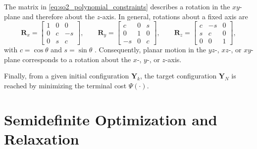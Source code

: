 The matrix in \eqref{eq:so2_polynomial_constraints} describes a rotation in the \(xy\)-plane and therefore about the \(z\)-axis. In general, rotations about a fixed axis are
\begin{equation}
\bm{R}_x=
\begin{bmatrix}
1&0&0\\
0&c&-s\\
0&s&c
\end{bmatrix},
\qquad
\bm{R}_y=
\begin{bmatrix}
c&0&s\\
0&1&0\\
-s&0&c
\end{bmatrix},
\qquad
\bm{R}_z=
\begin{bmatrix}
c&-s&0\\
s&c&0\\
0&0&1
\end{bmatrix},
\label{eq:axis_rotations}
\end{equation}
with \(c=\cos\theta\) and \(s=\sin\theta\) \cite{Sangli2025}.
Consequently, planar motion in the \(yz\)-, \(xz\)-, or \(xy\)-plane corresponds to a rotation about the \(x\)-, \(y\)-, or \(z\)-axis.

Finally, from a given initial configuration $\bm{Y}_k$, the target configuration $\bm{Y}_N$ is reached by minimizing the terminal cost \(\Psi(\cdot)\).

\section{Semidefinite Optimization and Relaxation}
\label{sec:semidefinite_optimization_relaxation}

